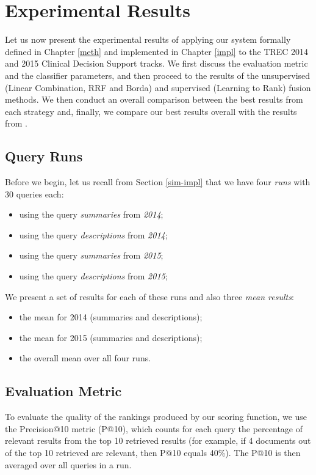 \chapter{Experimental Results}\label{exp}

Let us now present the experimental results of applying our system formally defined in Chapter \ref{meth} and implemented in Chapter
\ref{impl}
to the TREC 2014 and 2015 Clinical Decision Support tracks.
We first discuss the evaluation metric and the classifier parameters,
and then proceed to
the results of the unsupervised (Linear Combination, RRF and Borda)
and supervised (Learning to Rank) fusion methods. We then conduct an overall comparison between the best results from each strategy
and, finally, we compare our best results overall with the results from \cite{choi}.

\section{Query Runs}\label{runs} Before we begin, let us recall from Section \ref{sim-impl} that we have four \emph{runs} with 30 queries each:
\begin{itemize}
 \item using the query \emph{summaries} from \emph{2014};
 \item using the query \emph{descriptions} from \emph{2014};
 \item using the query \emph{summaries} from \emph{2015};
 \item using the query \emph{descriptions} from \emph{2015};
\end{itemize}

We present a set of results for each of these runs and also three \emph{mean results}:
\begin{itemize}
 \item the mean for 2014 (summaries and descriptions);
 \item the mean for 2015 (summaries and descriptions);
 \item the overall mean over all four runs.
\end{itemize}

\section{Evaluation Metric}
To evaluate the quality of the rankings produced by our scoring function, we use the Precision@10 metric (P@10), which counts for each query the percentage of
relevant results from the top 10 retrieved results (for example, if 4 documents out of the top 10 retrieved are relevant,
then P@10 equals 40\%). The P@10 is then averaged over all queries in a run.

